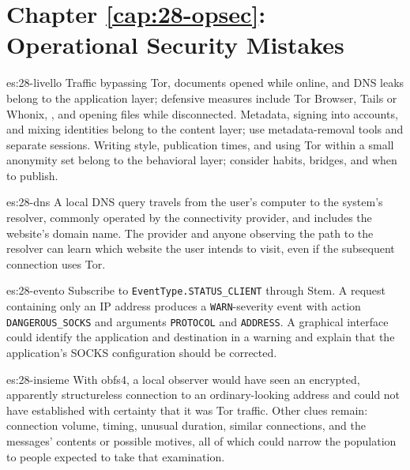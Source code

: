 \section*{Chapter \ref{cap:28-opsec}: Operational Security Mistakes}

\begin{soluzione}{es:28-livello}
Traffic bypassing Tor, documents opened while online, and DNS leaks belong to the application layer; defensive measures include Tor Browser, Tails or Whonix, , and opening files while disconnected. Metadata, signing into accounts, and mixing identities belong to the content layer; use metadata-removal tools and separate sessions. Writing style, publication times, and using Tor within a small anonymity set belong to the behavioral layer; consider habits, bridges, and when to publish.
\end{soluzione}

\begin{soluzione}{es:28-dns}
A local DNS query travels from the user's computer to the system's resolver, commonly operated by the connectivity provider, and includes the website's domain name. The provider and anyone observing the path to the resolver can learn which website the user intends to visit, even if the subsequent connection uses Tor.
\end{soluzione}

\begin{soluzione}{es:28-evento}
Subscribe to \texttt{EventType.STATUS\_CLIENT} through Stem. A request containing only an IP address produces a \texttt{WARN}-severity event with action \texttt{DANGEROUS\_SOCKS} and arguments \texttt{PROTOCOL} and \texttt{ADDRESS}. A graphical interface could identify the application and destination in a warning and explain that the application's SOCKS configuration should be corrected.
\end{soluzione}

\begin{soluzione}{es:28-insieme}
With obfs4, a local observer would have seen an encrypted, apparently structureless connection to an ordinary-looking address and could not have established with certainty that it was Tor traffic. Other clues remain: connection volume, timing, unusual duration, similar connections, and the messages' contents or possible motives, all of which could narrow the population to people expected to take that examination.
\end{soluzione}

